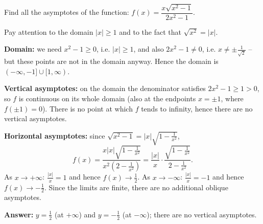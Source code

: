 
\begin{question}
Find all the asymptotes of the function: $f(x)=\dfrac{x\sqrt{x^2-1}}{2x^2-1}$.
\end{question}

\begin{hint}
Pay attention to the domain $|x|\ge1$ and to the fact that $\sqrt{x^2}=|x|$.
\end{hint}

\begin{solution}
\textbf{Domain:} we need $x^2-1\ge0$, i.e. $|x|\ge1$, and also $2x^2-1\ne0$, i.e. $x\ne\pm\frac1{\sqrt2}$ -- but these points are not in the domain anyway. Hence the domain is $(-\infty,-1]\cup[1,\infty)$.

\textbf{Vertical asymptotes:} on the domain the denominator satisfies $2x^2-1\ge1>0$, so $f$ is continuous on its whole domain (also at the endpoints $x=\pm1$, where $f(\pm1)=0$). There is no point at which $f$ tends to infinity, hence there are no vertical asymptotes.

\textbf{Horizontal asymptotes:} since $\sqrt{x^2-1}=|x|\sqrt{1-\frac1{x^2}}$,
\[ f(x)=\frac{x|x|\sqrt{1-\frac1{x^2}}}{x^2\left(2-\frac1{x^2}\right)}=\frac{|x|}{x}\cdot\frac{\sqrt{1-\frac1{x^2}}}{2-\frac1{x^2}}. \]
As $x\to+\infty$: $\frac{|x|}{x}=1$ and hence $f(x)\to\frac12$. As $x\to-\infty$: $\frac{|x|}{x}=-1$ and hence $f(x)\to-\frac12$. Since the limits are finite, there are no additional oblique asymptotes.

\textbf{Answer:} $y=\frac12$ (at $+\infty$) and $y=-\frac12$ (at $-\infty$); there are no vertical asymptotes.
\end{solution}
